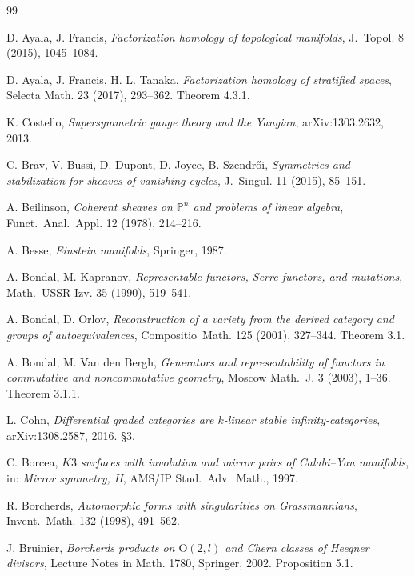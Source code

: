 \documentclass[11pt,reqno]{amsart}
\theoremstyle{plain}
\theoremstyle{definition}
\theoremstyle{remark}
\newcommand{\Pbb}{\mathbb{P}}
\begin{document}
\begin{thebibliography}{99}

 D. Ayala, J. Francis, \emph{Factorization homology of topological manifolds}, J.~Topol. 8 (2015), 1045--1084.

 D. Ayala, J. Francis, H. L. Tanaka, \emph{Factorization homology of stratified spaces}, Selecta Math. 23 (2017), 293--362. Theorem 4.3.1.

 K. Costello, \emph{Supersymmetric gauge theory and the Yangian}, arXiv:1303.2632, 2013.

 C. Brav, V. Bussi, D. Dupont, D. Joyce, B. Szendr\H{o}i, \emph{Symmetries and stabilization for sheaves of vanishing cycles}, J.~Singul. 11 (2015), 85--151.

 A. Beilinson, \emph{Coherent sheaves on $\Pbb^n$ and problems of linear algebra}, Funct.~Anal.~Appl. 12 (1978), 214--216.

 A. Besse, \emph{Einstein manifolds}, Springer, 1987.

 A. Bondal, M. Kapranov, \emph{Representable functors, Serre functors, and mutations}, Math.~USSR-Izv. 35 (1990), 519--541.

 A. Bondal, D. Orlov, \emph{Reconstruction of a variety from the derived category and groups of autoequivalences}, Compositio~Math. 125 (2001), 327--344. Theorem 3.1.

 A. Bondal, M. Van den Bergh, \emph{Generators and representability of functors in commutative and noncommutative geometry}, Moscow Math.~J. 3 (2003), 1--36. Theorem 3.1.1.

 L. Cohn, \emph{Differential graded categories are $k$-linear stable infinity-categories}, arXiv:1308.2587, 2016. \S3.

 C. Borcea, \emph{$K3$ surfaces with involution and mirror pairs of Calabi--Yau manifolds}, in: \emph{Mirror symmetry, II}, AMS/IP Stud.~Adv.~Math., 1997.

 R. Borcherds, \emph{Automorphic forms with singularities on Grassmannians}, Invent.~Math. 132 (1998), 491--562.

 J. Bruinier, \emph{Borcherds products on $\mathrm{O}(2, l)$ and Chern classes of Heegner divisors}, Lecture Notes in Math. 1780, Springer, 2002. Proposition 5.1.


\end{thebibliography}
\end{document}
